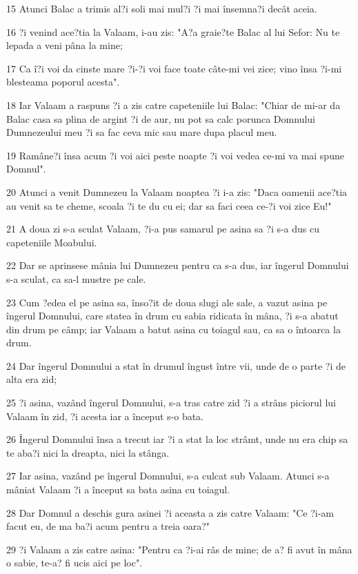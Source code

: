 \par 15 Atunci Balac a trimis al?i soli mai mul?i ?i mai însemna?i decât aceia.
\par 16 ?i venind ace?tia la Valaam, i-au zis: "A?a graie?te Balac al lui Sefor: Nu te lepada a veni pâna la mine;
\par 17 Ca î?i voi da cinste mare ?i-?i voi face toate câte-mi vei zice; vino însa ?i-mi blesteama poporul acesta".
\par 18 Iar Valaam a raspuns ?i a zis catre capeteniile lui Balac: "Chiar de mi-ar da Balac casa sa plina de argint ?i de aur, nu pot sa calc porunca Domnului Dumnezeului meu ?i sa fac ceva mic sau mare dupa placul meu.
\par 19 Ramâne?i însa acum ?i voi aici peste noapte ?i voi vedea ce-mi va mai spune Domnul".
\par 20 Atunci a venit Dumnezeu la Valaam noaptea ?i i-a zis: "Daca oamenii ace?tia au venit sa te cheme, scoala ?i te du cu ei; dar sa faci ceea ce-?i voi zice Eu!"
\par 21 A doua zi s-a sculat Valaam, ?i-a pus samarul pe asina sa ?i s-a dus cu capeteniile Moabului.
\par 22 Dar se aprinsese mânia lui Dumnezeu pentru ca s-a dus, iar îngerul Domnului s-a sculat, ca sa-l mustre pe cale.
\par 23 Cum ?edea el pe asina sa, înso?it de doua slugi ale sale, a vazut asina pe îngerul Domnului, care statea în drum cu sabia ridicata în mâna, ?i s-a abatut din drum pe câmp; iar Valaam a batut asina cu toiagul sau, ca sa o întoarca la drum.
\par 24 Dar îngerul Domnului a stat în drumul îngust între vii, unde de o parte ?i de alta era zid;
\par 25 ?i asina, vazând îngerul Domnului, s-a tras catre zid ?i a strâns piciorul lui Valaam în zid, ?i acesta iar a început s-o bata.
\par 26 Îngerul Domnului însa a trecut iar ?i a stat la loc strâmt, unde nu era chip sa te aba?i nici la dreapta, nici la stânga.
\par 27 Iar asina, vazând pe îngerul Domnului, s-a culcat sub Valaam. Atunci s-a mâniat Valaam ?i a început sa bata asina cu toiagul.
\par 28 Dar Domnul a deschis gura asinei ?i aceasta a zis catre Valaam: "Ce ?i-am facut eu, de ma ba?i acum pentru a treia oara?"
\par 29 ?i Valaam a zis catre asina: "Pentru ca ?i-ai râs de mine; de a? fi avut în mâna o sabie, te-a? fi ucis aici pe loc".
